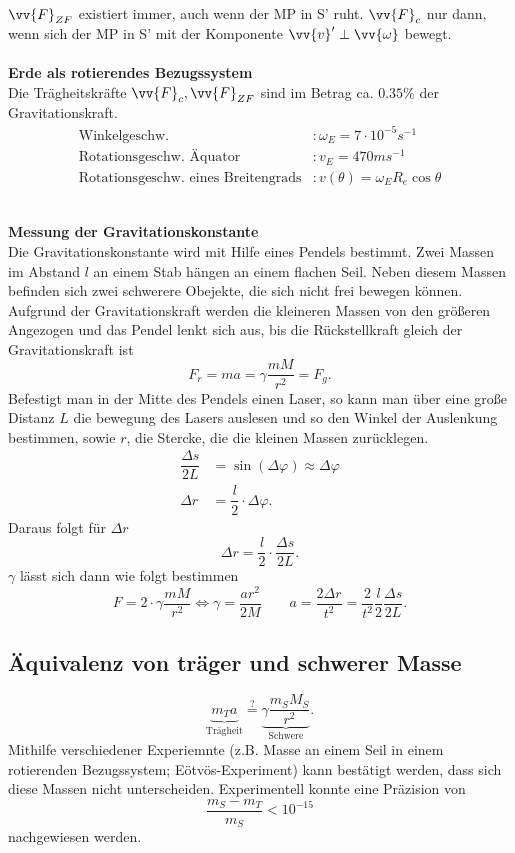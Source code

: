 \documentclass[a4paper,12pt]{article}
\begin{document}
$\vv{F}_{ZF}$ existiert immer, auch wenn der MP in S' ruht. $\vv{F}_c$ nur dann, wenn sich der MP in S' mit der Komponente $\vv{v}'\perp \vv{\omega }$ bewegt.
\\\hfill\\\textbf{Erde als rotierendes Bezugssystem}\\
Die Trägheitskräfte $\vv{F}_c,\vv{F}_{ZF}$ sind im Betrag ca. $0.35\%$ der Gravitationskraft.
\begin{align*}
        \text{Winkelgeschw.}&:\omega _E=7\cdot 10^{-5}s ^{-1}\\
        \text{Rotationsgeschw. Äquator}&:v_E=470m s ^{-1}\\
        \text{Rotationsgeschw. eines Breitengrads}&:v\left(\theta \right)=\omega _ER_e\cos \theta 
\end{align*}

\hfill\\\textbf{Messung der Gravitationskonstante}\\ 
Die Gravitationskonstante wird mit Hilfe eines Pendels bestimmt. Zwei Massen im Abstand $l$ an einem Stab hängen an einem flachen Seil. Neben diesem Massen befinden sich zwei schwerere Obejekte, die sich nicht frei bewegen können. Aufgrund der Gravitationskraft werden die kleineren Massen von den größeren Angezogen und das Pendel lenkt sich aus, bis die Rückstellkraft gleich der Gravitationskraft ist
\[ 
        F_r=ma=\gamma \dfrac{mM}{r^2}=F_g
.\] 
Befestigt man in der Mitte des Pendels einen Laser, so kann man über eine große Distanz $L$ die bewegung des Lasers auslesen und so den Winkel der Auslenkung bestimmen, sowie $r$, die Stercke, die die kleinen Massen zurücklegen.
\begin{align*}
        \dfrac{\Delta s}{2L}&=\sin \left(\Delta \varphi \right)\approx \Delta \varphi \\
        \Delta r&=\dfrac{l}{2}\cdot \Delta \varphi 
.\end{align*} 
Daraus folgt für $\Delta r$ 
\[ 
        \Delta r=\dfrac{l}{2}\cdot \dfrac{\Delta s}{2L}
.\] 
$\gamma $ lässt sich dann wie folgt bestimmen
\[ 
        F=2\cdot \gamma \dfrac{mM}{r^2}\Leftrightarrow \gamma =\dfrac{ar^2}{2M}\qquad a=\dfrac{2\Delta r}{t^2}=\dfrac{2}{t^2}\dfrac{l}{2}\dfrac{\Delta s}{2L}
.\] 

\subsection{Äquivalenz von träger und schwerer Masse}
\[ 
        \underbrace{m_Ta}_{\text{Trägheit}}\stackrel{?}{=}\underbrace{\gamma \dfrac{m_SM_S}{r^2}}_{\text{Schwere}}
.\] 
Mithilfe verschiedener Experiemnte (z.B. Masse an einem Seil in einem rotierenden Bezugssystem; Eötvös-Experiment) kann bestätigt werden, dass sich diese Massen nicht unterscheiden. Experimentell konnte eine Präzision von
\[ 
        \dfrac{m_S-m_T}{m_S}<10^{-15}
\] 
nachgewiesen werden.
\end{document}
